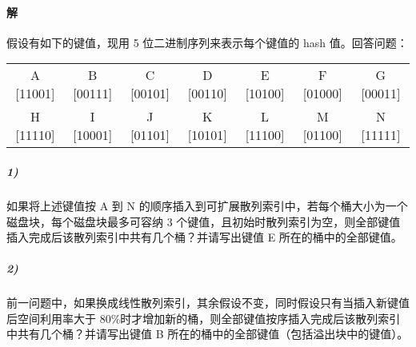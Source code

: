 \documentclass{article}
\makeatletter
\renewcommand{\section}{\@startsection{section}{1}{0mm}
                                {-5ex plus -.5ex minus -.2ex}
                                {3ex plus .2ex}
                                {\normalfont\large\bfseries}}
\makeatother
\begin{document}
\paragraph{解}

\section{假设有如下的键值，现用 5 位二进制序列来表示每个键值的 hash 值。回答问题：}
\begin{table}[h]
    \centering
    \begin{tabular}{ccccccc}
        A [11001] & B [00111] & C [00101] & D [00110] & E [10100] & F [01000] & G [00011] \\
        H [11110] & I [10001] & J [01101] & K [10101] & L [11100] & M [01100] & N [11111]
    \end{tabular}
\end{table}
\subparagraph{1)} 如果将上述键值按 A 到 N 的顺序插入到可扩展散列索引中，若每个桶大小为一个磁盘块，每个磁盘块最多可容纳 3 个键值，且初始时散列索引为空，则全部键值插入完成后该散列索引中共有几个桶？并请写出键值 E 所在的桶中的全部键值。
\subparagraph{2)} 前一问题中，如果换成线性散列索引，其余假设不变，同时假设只有当插入新键值后空间利用率大于 80\%时才增加新的桶，则全部键值按序插入完成后该散列索引中共有几个桶？并请写出键值 B 所在的桶中的全部键值（包括溢出块中的键值）。
\end{document}

